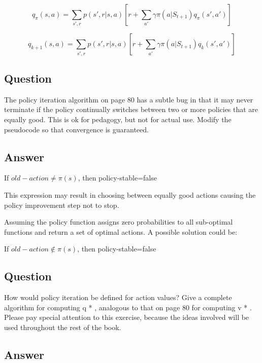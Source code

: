 \documentclass[11pt]{article}
\begin{document}
    \begin{equation}
        q_{\pi}(s, a) = \sum_{s',r} p(s', r | s, a) [r + \sum_{a'} \gamma \pi(a|S_{t+1}) q_\pi(s', a')]
    \end{equation}

    \begin{equation}
        \label{eqn:eq4_5}
        q_{k+1}(s, a) = \sum_{s',r} p(s', r | s, a) [r + \sum_{a'} \gamma \pi(a|S_{t+1}) q_k(s', a')]
    \end{equation}

    \subsection{Question}

    The policy iteration algorithm on page 80 has a subtle bug in that it may never terminate if the policy continually switches between two or more policies that are equally good.
    This is ok for pedagogy, but not for actual use.
    Modify the pseudocode so that convergence is guaranteed.

    \subsection*{Answer}

    If $old-action \neq \pi(s)$, then policy-stable=false

    This expression may result in choosing between equally good actions causing the policy improvement step not to stop.

    Assuming the policy function assigns zero probabilities to all sub-optimal functions and return a set of optimal actions. A possible solution could be:

    If $old-action \notin \pi(s)$, then policy-stable=false

    \subsection{Question}

    How would policy iteration be defined for action values?
    Give a complete algorithm for computing q * , analogous to that on page 80 for computing v * .
    Please pay special attention to this exercise, because the ideas involved will be used throughout the rest of the book.

    \subsection*{Answer}
\end{document}
